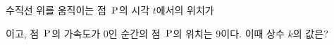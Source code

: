 수직선 위를 움직이는 점~$\mathrm{P}$의 시각 $t$에서의 위치가\par\smallskip{}\par\smallskip\noindent 이고, 점~$\mathrm{P}$의 가속도가 $0$인 순간의 점~$\mathrm{P}$의 위치는 $9$이다. 이때 상수 $k$의 값은?
